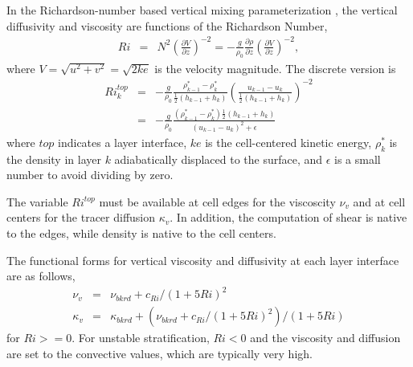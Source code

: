 In the Richardson-number based vertical mixing parameterization \citep{Pacanowski_Philander81jpo}, the vertical diffusivity and viscosity are functions of the Richardson Number,
\begin{eqnarray}   
\label{Ri1}
Ri &=& N^2
\left(\frac{\partial V}{\partial z} \right)^{-2}
 = -\frac{g}{\rho_0}\frac{\partial \rho}{\partial z}
\left(\frac{\partial V}{\partial z} \right)^{-2},
\end{eqnarray}
where $V=\sqrt{u^2+v^2}=\sqrt{2ke}$ is the velocity magnitude.  The discrete version is
\begin{eqnarray}   
Ri^{top}_k &=& -\frac{g}{\rho_0}\frac{\rho^*_{k-1}-\rho^*_k}{\frac{1}{2}(h_{k-1}+h_k)}
\left(\frac{u_{k-1}-u_k}{\frac{1}{2}(h_{k-1}+h_k)}\right)^{-2}\\
 &=& -\frac{g}{\rho_0}\frac{(\rho^*_{k-1}-\rho^*_k)\frac{1}{2}(h_{k-1}+h_k)}
{(u_{k-1}-u_k)^2+\epsilon}
\end{eqnarray}
where $top$ indicates a layer interface, $ke$ is the cell-centered kinetic energy, $\rho^*_k$ is the density in layer $k$ adiabatically displaced to the surface, and $\epsilon$ is a small number to avoid dividing by zero.  

The variable $Ri^{top}$ must be available at cell edges for the viscoscity $\nu_v$ and at cell centers for the tracer diffusion $\kappa_v$.  In addition, the computation of shear is native to the edges, while density is native to the cell centers.  

The functional forms for vertical viscosity and diffusivity at each layer interface are as follows,
\begin{eqnarray} \label{visc1}  
\nu_v &=& \nu_{bkrd} + c_{Ri}/(1+5Ri)^2\\
\kappa_v &=& \kappa_{bkrd} + (\nu_{bkrd} + c_{Ri}/(1+5Ri)^2)/(1+5Ri)
\end{eqnarray}
for $Ri>=0$.  For unstable stratification, $Ri<0$ and the viscosity and diffusion are set to the convective values, which are typically very high.
